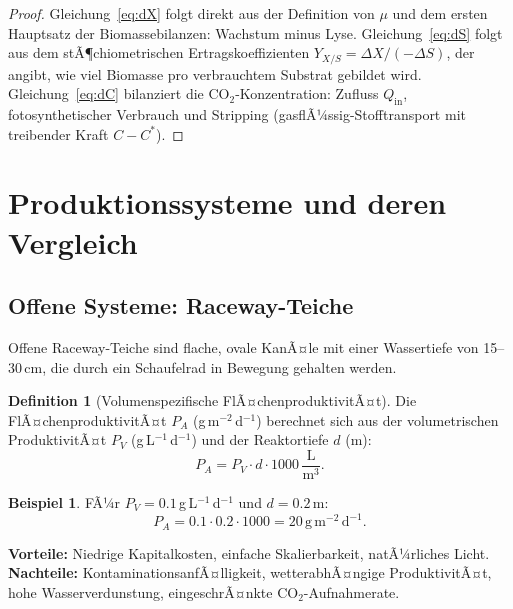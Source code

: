 ﻿\documentclass[a4paper,12pt]{article}
\theoremstyle{definition}
\newtheorem{definition}{Definition}
\newtheorem{beispiel}{Beispiel}
\begin{document}
\begin{proof}
	Gleichung~\eqref{eq:dX} folgt direkt aus der Definition von $\mu$ und dem
	ersten Hauptsatz der Biomassebilanzen: Wachstum minus Lyse.
	Gleichung~\eqref{eq:dS} folgt aus dem stÃ¶chiometrischen Ertragskoeffizienten
	$Y_{X/S} = \Delta X / (-\Delta S)$, der angibt, wie viel Biomasse pro
	verbrauchtem Substrat gebildet wird.
	Gleichung~\eqref{eq:dC} bilanziert die $\mathrm{CO}_2$-Konzentration:
	Zufluss $Q_\mathrm{in}$, fotosynthetischer Verbrauch und
	Stripping (gasflÃ¼ssig-Stofftransport mit treibender Kraft $C - C^*$). \qedhere
\end{proof}

\section{Produktionssysteme und deren Vergleich}

\subsection{Offene Systeme: Raceway-Teiche}

Offene Raceway-Teiche sind flache, ovale KanÃ¤le mit einer Wassertiefe von
15--30\,cm, die durch ein Schaufelrad in Bewegung gehalten werden.

\begin{definition}[Volumenspezifische FlÃ¤chenproduktivitÃ¤t]
	Die FlÃ¤chenproduktivitÃ¤t $P_A$ (g\,m$^{-2}$\,d$^{-1}$) berechnet sich aus der
	volumetrischen ProduktivitÃ¤t $P_V$ (g\,L$^{-1}$\,d$^{-1}$) und der
	Reaktortiefe $d$ (m):
	\[
		P_A = P_V \cdot d \cdot 1000\,\frac{\mathrm{L}}{\mathrm{m}^3}.
	\]
\end{definition}

\begin{beispiel}
	FÃ¼r $P_V = 0.1$\,g\,L$^{-1}$\,d$^{-1}$ und $d = 0.2$\,m:
	\[
		P_A = 0.1 \cdot 0.2 \cdot 1000 = 20\,\mathrm{g}\,\mathrm{m}^{-2}\,\mathrm{d}^{-1}.
	\]
\end{beispiel}

\textbf{Vorteile:} Niedrige Kapitalkosten, einfache Skalierbarkeit, natÃ¼rliches Licht.\\
\textbf{Nachteile:} KontaminationsanfÃ¤lligkeit, wetterabhÃ¤ngige ProduktivitÃ¤t,
hohe Wasserverdunstung, eingeschrÃ¤nkte CO$_2$-Aufnahmerate.
\end{document}
